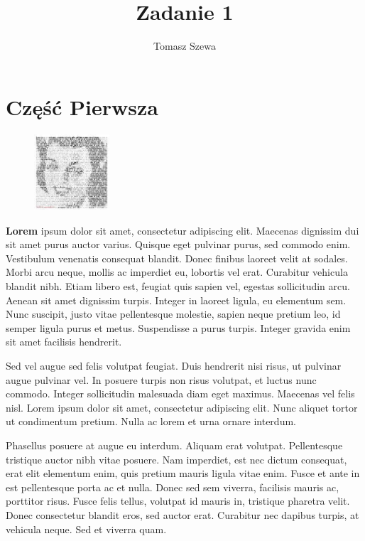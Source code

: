 \documentclass[]{article}
\title{Zadanie 1}
\author{Tomasz Szewa}
\begin{document}
\maketitle

\newpage
\tableofcontents
\newpage
\section{Część Pierwsza}

\begin{figure}
	\centering
	\includegraphics[width=0.25\textwidth]{lorem}
\end{figure}

\textbf{Lorem} \cite{pierwszy} ipsum dolor sit amet, consectetur adipiscing elit. Maecenas dignissim dui sit amet purus auctor varius. Quisque eget pulvinar purus, sed commodo enim. Vestibulum venenatis consequat blandit. Donec finibus laoreet velit at sodales. Morbi arcu neque, mollis ac imperdiet eu, lobortis vel erat. Curabitur vehicula blandit nibh. Etiam libero est, feugiat quis sapien vel, egestas sollicitudin arcu. Aenean sit amet dignissim turpis. Integer in laoreet ligula, eu elementum sem. Nunc suscipit, justo vitae pellentesque molestie, sapien neque pretium leo, id semper ligula purus et metus. Suspendisse a purus turpis. Integer gravida enim sit amet facilisis hendrerit.

Sed vel augue sed felis volutpat feugiat. Duis hendrerit nisi risus, ut pulvinar augue pulvinar vel. In posuere turpis non risus volutpat, et luctus nunc commodo. Integer sollicitudin malesuada diam eget maximus. Maecenas vel felis nisl. Lorem ipsum dolor sit amet, consectetur adipiscing elit. Nunc aliquet tortor ut condimentum pretium. Nulla ac lorem et urna ornare interdum.

Phasellus posuere at augue eu interdum. Aliquam erat volutpat. Pellentesque tristique auctor nibh vitae posuere. Nam imperdiet, est nec dictum consequat, erat elit elementum enim, quis pretium mauris ligula vitae enim. Fusce et ante in est pellentesque porta ac et nulla. Donec sed sem viverra, facilisis mauris ac, porttitor risus. Fusce felis tellus, volutpat id mauris in, tristique pharetra velit. Donec consectetur blandit eros, sed auctor erat. Curabitur nec dapibus turpis, at vehicula neque. Sed et viverra quam.
\end{document}
